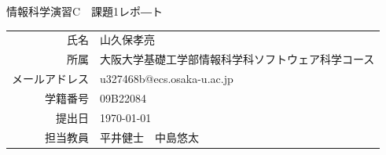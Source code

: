 \documentclass[dvipdfmx]{jarticle}
\begin{document}
\begin{titlepage}
    \begin{center}
        {\huge 情報科学演習C　課題1レポ―ト}
        \vspace{180pt}\\
        \begin{tabular}{rl}
            氏名 & 山久保孝亮\\
            所属 & 大阪大学基礎工学部情報科学科ソフトウェア科学コース\\
            メールアドレス & u327468b@ecs.osaka-u.ac.jp\\
            学籍番号 & 09B22084\\
            提出日 & \today\\
            担当教員 & 平井健士　中島悠太
        \end{tabular}
    \end{center}
\end{titlepage}
\end{document}
